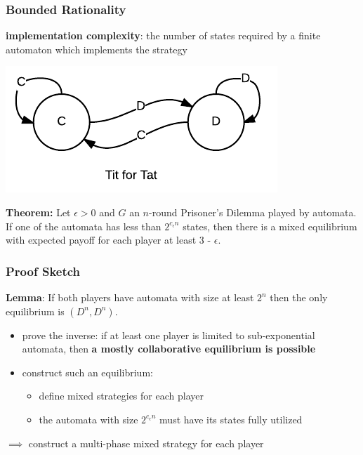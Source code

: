 \documentclass{beamer}
\begin{document}
\begin{frame}
	\frametitle{Bounded Rationality}
	\textbf{implementation complexity}: the number of states required by a finite automaton which implements the strategy	
	
	\includegraphics[scale=0.5]{tit4tat}
	
	
	\noindent \textbf{Theorem:} Let $\epsilon > 0$ and $G$ an $n$-round Prisoner's Dilemma played by automata. If one of the automata has less than $2^{c_\epsilon n}$ states, then there is a mixed equilibrium with expected payoff for each player at least 3 - $\epsilon$.
	
	
\end{frame}

\begin{frame}
	\frametitle{Proof Sketch}
	
	\textbf{Lemma}: If both players have automata with size at least $2^n$ then the only equilibrium is $(D^n, D^n)$.
	
	\begin{itemize}
		\item prove the inverse: if at least one player is limited to sub-exponential automata, then \textbf{a mostly collaborative equilibrium is possible}
		\item construct such an equilibrium:
		\begin{itemize}
			\item define mixed strategies for each player
			\item the automata with size $2^{c_\epsilon n}$ must have its states fully utilized
		\end{itemize}
	\end{itemize}
	
	$\implies$ construct a multi-phase mixed strategy for each player
	
\end{frame}
\end{document}
